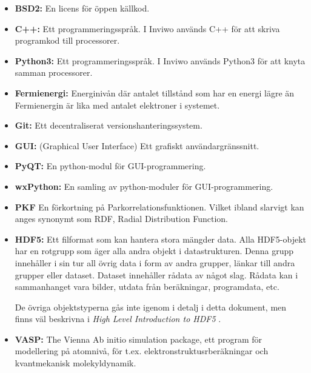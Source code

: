 \begin{itemize}
\item \textbf{BSD2:} En licens för öppen källkod.
	\cite{BSD2}

\item \textbf{C++:} Ett programmeringsspråk.
	\cite{C++}
	\newline
	I Inviwo används C++ för att skriva programkod till processorer.

\item \textbf{Python3:} Ett programmeringsspråk.
	\cite{Python3}
	\newline
	I Inviwo används Python3 för att knyta samman processorer.

\item \textbf{Fermienergi:} Energinivån där antalet tillstånd som har en energi lägre än Fermienergin är lika med antalet elektroner i systemet. \cite{Fermi-energi}

\item \textbf{Git:} Ett decentraliserat versionshanteringssystem.
\cite{Git}
    
\item \textbf{GUI:} (Graphical User Interface) Ett grafiskt
användargränssnitt.
\cite{GUI}

\item \textbf{PyQT:} En python-modul för GUI-programmering.\cite{PyQT}

\item \textbf{wxPython:} En samling av python-moduler för GUI-programmering.\cite{wxPython}

\item \textbf{PKF} En förkortning på Parkorrelationsfunktionen. Vilket ibland slarvigt kan anges synonymt som RDF, Radial Distribution Function.

\item \textbf{HDF5:} Ett filformat som kan hantera stora mängder data. Alla HDF5-objekt har en rotgrupp som äger alla andra objekt i datastrukturen. Denna grupp innehåller i sin tur all övrig data i form av andra grupper, länkar till andra grupper eller dataset. Dataset innehåller rådata av något slag. Rådata kan i sammanhanget vara bilder, utdata från beräkningar, programdata, etc. \cite{HDF group} \cite{HDF group2} 

De övriga objektstyperna gås inte igenom i detalj i detta dokument,
men finns väl beskrivna i \emph{High Level Introduction to HDF5} \cite{HDF group2}.

\item \textbf{VASP:} The Vienna Ab initio simulation package, ett program för modellering på atomnivå, för t.ex. elektronstruktusrberäkningar och kvantmekanisk molekyldynamik.
\cite{VASP}


\end{itemize}
